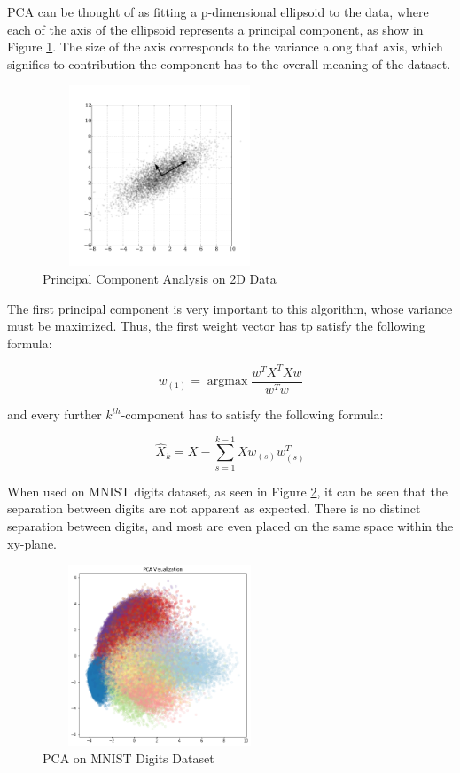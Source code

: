 \documentclass[twocolumn]{article}
\begin{document}
PCA can be thought of as fitting a p-dimensional ellipsoid to the data, where each of the axis of
the ellipsoid represents a principal component, as show in Figure \ref{fig:pca_technical}. The size
of the axis corresponds to the variance along that axis, which signifies to contribution the
component has to the overall meaning of the dataset.

\begin{figure}[hbt]
  \centering
  \includegraphics[width=7cm, height=5.4cm]{pca_technical.png}
  \caption{Principal Component Analysis on 2D Data}
  \label{fig:pca_technical}
\end{figure}

The first principal component is very important to this algorithm, whose variance must be maximized.
Thus, the first weight vector has tp satisfy the following formula:

\begin{equation}
  w_{(1)} = \operatorname*{argmax}{\frac{w^TX^TXw}{w^Tw}}
  \label{eqn:first_component}
\end{equation}

and every further $k^{th}$-component has to satisfy the following formula:

\begin{equation}
  \hat{X}_k = X - \sum_{s=1}^{k-1} Xw_{(s)}w^T_{(s)}
  \label{eqn:kth_component}
\end{equation}

When used on MNIST digits dataset, as seen in Figure \ref{fig:pca}, it can be seen that the separation
between digits are not apparent as expected. There is no distinct separation between digits, and
most are even placed on the same space within the xy-plane.

\begin{figure}[hbt]
  \centering
  \includegraphics[width=7cm, height=5.4cm]{pca.png}
  \caption{PCA on MNIST Digits Dataset}
  \label{fig:pca}
\end{figure}
\end{document}
